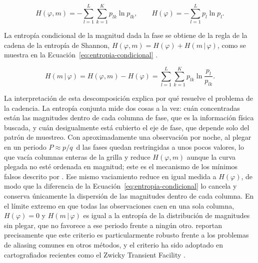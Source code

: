 \documentclass[12pt,letterpaper,oneside]{book}
\begin{document}
\begin{equation}
	H(\varphi,m) = -\sum_{l=1}^{L}\sum_{k=1}^{K} p_{lk}\ln p_{lk}, \qquad H(\varphi) = -\sum_{l=1}^{L} p_{l}\ln p_{l}.
	\label{eq:entropias-conjunta-fase}
\end{equation}

La entrop\'ia condicional de la magnitud dada la fase se obtiene de la regla de la cadena de la entrop\'ia de Shannon, $H(\varphi,m)=H(\varphi)+H(m\,|\,\varphi)$, como se muestra en la Ecuaci\'on~\eqref{eq:entropia-condicional} \citep{Graham2013b}.

\begin{equation}
	H(m\,|\,\varphi) = H(\varphi,m) - H(\varphi) = \sum_{l=1}^{L}\sum_{k=1}^{K} p_{lk}\ln\frac{p_{l}}{p_{lk}}.
	\label{eq:entropia-condicional}
\end{equation}

La interpretaci\'on de esta descomposici\'on explica por qu\'e resuelve el problema de la cadencia. La entrop\'ia conjunta mide dos cosas a la vez: cu\'an concentradas est\'an las magnitudes dentro de cada columna de fase, que es la informaci\'on f\'isica buscada, y cu\'an desigualmente est\'a cubierto el eje de fase, que depende solo del patr\'on de muestreo. Con aproximadamente una observaci\'on por noche, al plegar en un periodo $P\approx p/q$~d las fases quedan restringidas a unos pocos valores, lo que vac\'ia columnas enteras de la grilla y reduce $H(\varphi,m)$ aunque la curva plegada no est\'e ordenada en magnitud; este es el mecanismo de los m\'inimos falsos descrito por \citet{Henao2021}. Ese mismo vaciamiento reduce en igual medida a $H(\varphi)$, de modo que la diferencia de la Ecuaci\'on~\eqref{eq:entropia-condicional} lo cancela y conserva \'unicamente la dispersi\'on de las magnitudes dentro de cada columna. En el l\'imite extremo en que todas las observaciones caen en una sola columna, $H(\varphi)=0$ y $H(m\,|\,\varphi)$ es igual a la entrop\'ia de la distribuci\'on de magnitudes sin plegar, que no favorece a ese periodo frente a ning\'un otro. \citet{Graham2013b} reportan precisamente que este criterio es particularmente robusto frente a los problemas de aliasing comunes en otros m\'etodos, y el criterio ha sido adoptado en cartografiados recientes como el Zwicky Transient Facility \citep{Coughlin2021}.
\end{document}
